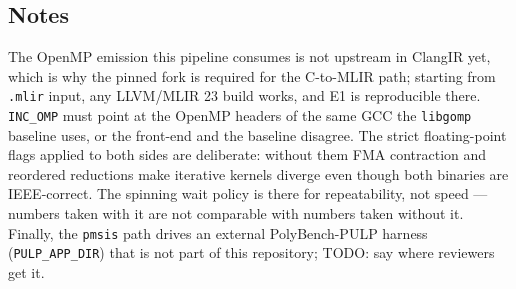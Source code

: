 \subsection{Notes}

The OpenMP emission this pipeline consumes is not upstream in ClangIR yet,
which is why the pinned fork is required for the C-to-MLIR path; starting from
\texttt{.mlir} input, any LLVM/MLIR 23 build works, and E1 is reproducible
there.  \texttt{INC\_OMP} must point at the OpenMP headers of the same GCC the
\texttt{libgomp} baseline uses, or the front-end and the baseline disagree.
The strict floating-point flags applied to both sides are deliberate: without
them FMA contraction and reordered reductions make iterative kernels diverge
even though both binaries are IEEE-correct.  The spinning wait policy is there
for repeatability, not speed --- numbers taken with it are not comparable with
numbers taken without it.  Finally, the \texttt{pmsis} path drives an external
PolyBench-PULP harness (\texttt{PULP\_APP\_DIR}) that is not part of this
repository; TODO: say where reviewers get it.
